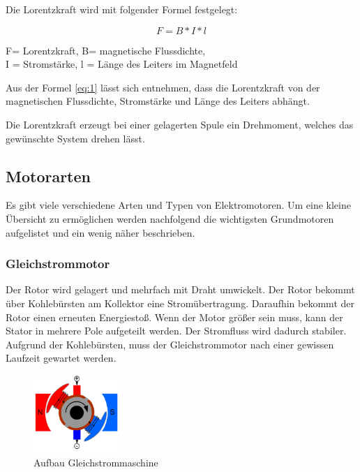 Die Lorentzkraft wird mit folgender Formel festgelegt:

\begin{equation}
\label{eq:1}
 F = B * I * l
\end{equation}
\begin{center}
F= Lorentzkraft, B= magnetische Flussdichte, \\ I = Stromstärke, l = Länge des Leiters im Magnetfeld
\end{center}

Aus der Formel \ref{eq:1} lässt sich entnehmen, dass die Lorentzkraft von der magnetischen Flussdichte, Stromstärke und Länge des Leiters abhängt.

Die Lorentzkraft erzeugt bei einer gelagerten Spule ein Drehmoment, welches das gewünschte System drehen lässt.

\subsection{Motorarten}
\label{sec:motorarten}

Es gibt viele verschiedene Arten und Typen von Elektromotoren. Um eine kleine Übersicht zu ermöglichen werden nachfolgend die wichtigsten Grundmotoren aufgelistet und ein wenig näher beschrieben.

\subsubsection{Gleichstrommotor}
\label{sec:gleichstrommotor}

Der Rotor wird gelagert und mehrfach mit Draht umwickelt. Der Rotor bekommt über Kohlebürsten am Kollektor eine Stromübertragung. Daraufhin bekommt der Rotor einen erneuten Energiestoß. Wenn der Motor größer sein muss, kann der Stator in mehrere Pole aufgeteilt werden. Der Stromfluss wird dadurch stabiler. Aufgrund der Kohlebürsten, muss der Gleichstrommotor nach einer gewissen Laufzeit gewartet werden.

\begin{figure}[H]
\begin{center}
	\includegraphics[width=0.3\textwidth]{fig/Gleichstommaschine}
	\caption{Aufbau Gleichstrommaschine \label{fig:gleichstrommotor} \cite{aufbauGleichstrommotor}}
\end{center}
\end{figure}

